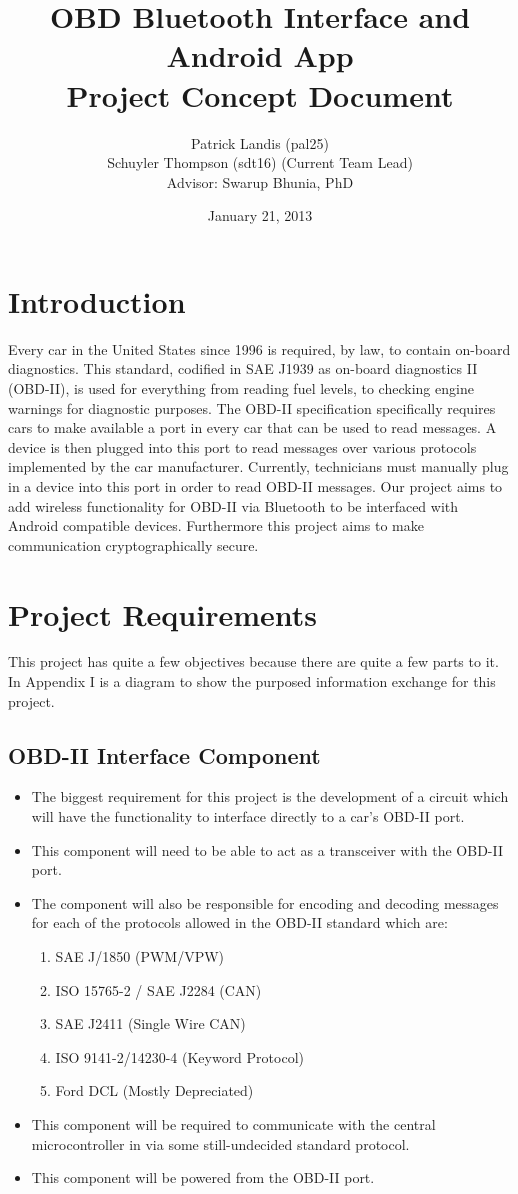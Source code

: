 \documentclass[12pt,letterpaper]{article}
\title{
\textbf{\LARGE OBD Bluetooth Interface and Android App} \\
\Large Project Concept Document
}
\author{
\normalsize Patrick Landis (pal25) \\
\normalsize Schuyler Thompson (sdt16) (Current Team Lead) \\
\normalsize Advisor: Swarup Bhunia, PhD
}
\date{\normalsize January 21, 2013}
\begin{document}
\maketitle

\section{Introduction}
Every car in the United States since 1996 is required, by law, to contain on-board diagnostics. This standard, codified in SAE J1939 as on-board diagnostics II (OBD-II), is used for everything from reading fuel levels, to checking engine warnings for diagnostic purposes. The OBD-II specification specifically requires cars to make available a port in every car that can be used to read messages. A device is then plugged into this port to read messages over various protocols implemented by the car manufacturer. Currently, technicians must manually plug in a device into this port in order to read OBD-II messages. Our project aims to add wireless functionality for OBD-II via Bluetooth to be interfaced with Android compatible devices. Furthermore this project aims to make communication cryptographically secure.


\section{Project Requirements}
This project has quite a few objectives because there are quite a few parts to it. In Appendix I is a diagram to show the purposed information exchange for this project.

\subsection {OBD-II Interface Component}
\begin{itemize}
	\item The biggest requirement for this project is the development of a circuit which will have the functionality to interface directly to a car's OBD-II port. 
	\item This component will need to be able to act as a transceiver with the OBD-II port.
	\item The component will also be responsible for encoding and decoding messages for each of the protocols allowed in the OBD-II standard which are:
	\begin{enumerate}
		\item SAE J/1850 (PWM/VPW)
		\item ISO 15765-2 / SAE J2284 (CAN)
		\item SAE J2411 (Single Wire CAN)
		\item ISO 9141-2/14230-4 (Keyword Protocol)
		\item Ford DCL (Mostly Depreciated) 
	\end{enumerate}
	\item This component will be required to communicate with the central microcontroller in via some still-undecided standard protocol.
	\item This component will be powered from the OBD-II port.
\end{itemize}
\end{document}
